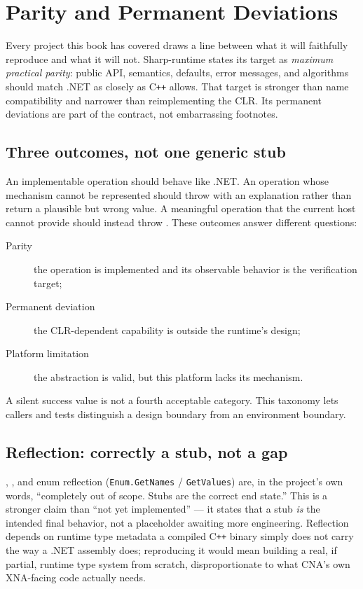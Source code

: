 \chapter{Parity and Permanent Deviations}
\label{ch:parity-philosophy}

Every project this book has covered draws a line between what it will faithfully reproduce
and what it will not. Sharp-runtime states its target as \emph{maximum practical parity}:
public API, semantics, defaults, error messages, and algorithms should match .NET as closely
as C\texttt{++} allows. That target is stronger than name compatibility and narrower than
reimplementing the CLR. Its permanent deviations are part of the contract, not embarrassing
footnotes.

\section{Three outcomes, not one generic stub}

An implementable operation should behave like .NET. An operation whose mechanism cannot be
represented should throw  with an explanation rather than
return a plausible but wrong value. A meaningful operation that the current host cannot
provide should instead throw . These outcomes answer
different questions:

\begin{description}
  \item[Parity] the operation is implemented and its observable behavior is the verification
  target;
  \item[Permanent deviation] the CLR-dependent capability is outside the runtime's design;
  \item[Platform limitation] the abstraction is valid, but this platform lacks its mechanism.
\end{description}

A silent success value is not a fourth acceptable category. This taxonomy lets callers and
tests distinguish a design boundary from an environment boundary.

\section{Reflection: correctly a stub, not a gap}

, , and enum reflection (\texttt{Enum.GetNames} /
\texttt{GetValues}) are, in the project's own words, ``completely out of scope. Stubs are the
correct end state.'' This is a stronger claim than ``not yet implemented'' --- it states that
a stub \emph{is} the intended final behavior, not a placeholder awaiting more engineering.
Reflection depends on runtime type metadata a compiled C\texttt{++} binary simply does not
carry the way a .NET assembly does; reproducing it would mean building a real, if partial,
runtime type system from scratch, disproportionate to what CNA's own XNA-facing code actually
needs.

